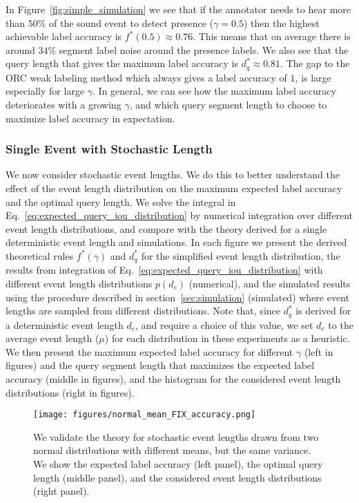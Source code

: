 In Figure~\ref{fig:simple_simulation} we see that if the annotator needs to hear more than $50$\% of the sound event to detect presence ($\gamma=0.5$) then the highest achievable label accuracy is $f^*(0.5) \approx 0.76$. This means that on average there is around $34$\% segment label noise around the presence labels. We also see that the query length that gives the maximum label accuracy is $d_q^* \approx 0.81$. The gap to the ORC weak labeling method which always gives a label accuracy of $1$, is large especially for large $\gamma$. In general, we can see how the maximum label accuracy deteriorates with a growing $\gamma$, and which query segment length to choose to maximize label accuracy in expectation. 

\subsubsection{Single Event with Stochastic Length}
\label{sec:event_distribution}
We now consider stochastic event lengths. We do this to better understand the effect of the event length distribution on the maximum expected label accuracy and the optimal query length. We solve the integral in Eq.~\ref{eq:expected_query_iou_distribution} by numerical integration over different event length distributions, and compare with the theory derived for a single deterministic event length and simulations. In each figure we present the derived theoretical rules $f^*(\gamma)$ and $d_q^*$ for the simplified event length distribution, the results from integration of Eq.~\ref{eq:expected_query_iou_distribution} with different event length distributions $p(d_e)$ (numerical), and the simulated results using the procedure described in section~\ref{sec:simulation} (simulated) where event lengths are sampled from different distributions. Note that, since $d_q^*$ is derived for a deterministic event length $d_e$, and require a choice of this value, we set $d_e$ to the average event length ($\mu$) for each distribution in these experiments as a heuristic. We then present the maximum expected label accuracy for different $\gamma$ (left in figures) and the query segment length that maximizes the expected label accuracy (middle in figures), and the histogram for the considered event length distributions (right in figures).

\begin{figure}
    \centering
    \texttt{[image: figures/normal\_mean\_FIX\_accuracy.png]}
    \caption{We validate the theory for stochastic event lengths drawn from two normal distributions with different means, but the same variance. We show the expected label accuracy (left panel), the optimal query length (middle panel), and the considered event length distributions (right panel).}
    \label{fig:normal_mean}
\end{figure}


